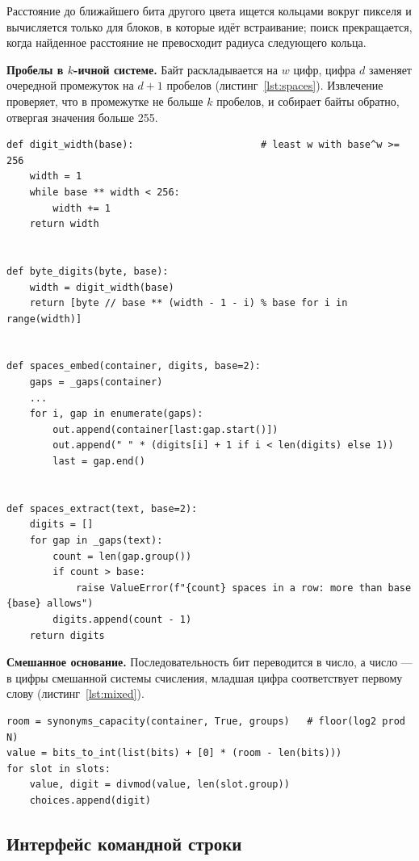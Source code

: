 \documentclass[14pt,a4paper]{extarticle}
\begin{document}
Расстояние до ближайшего бита другого цвета ищется кольцами вокруг пикселя и
вычисляется только для блоков, в которые идёт встраивание; поиск прекращается, когда
найденное расстояние не превосходит радиуса следующего кольца.

\textbf{Пробелы в $k$-ичной системе.} Байт раскладывается на $w$ цифр, цифра $d$
заменяет очередной промежуток на $d + 1$ пробелов (листинг~\ref{lst:spaces}).
Извлечение проверяет, что в промежутке не больше $k$ пробелов, и собирает байты
обратно, отвергая значения больше 255.

\begin{lstlisting}[style=python, caption={Пробелы в $k$-ичной системе}, label={lst:spaces}]
def digit_width(base):                      # least w with base^w >= 256
    width = 1
    while base ** width < 256:
        width += 1
    return width


def byte_digits(byte, base):
    width = digit_width(base)
    return [byte // base ** (width - 1 - i) % base for i in range(width)]


def spaces_embed(container, digits, base=2):
    gaps = _gaps(container)
    ...
    for i, gap in enumerate(gaps):
        out.append(container[last:gap.start()])
        out.append(" " * (digits[i] + 1 if i < len(digits) else 1))
        last = gap.end()


def spaces_extract(text, base=2):
    digits = []
    for gap in _gaps(text):
        count = len(gap.group())
        if count > base:
            raise ValueError(f"{count} spaces in a row: more than base {base} allows")
        digits.append(count - 1)
    return digits
\end{lstlisting}

\textbf{Смешанное основание.} Последовательность бит переводится в число, а число ---
в цифры смешанной системы счисления, младшая цифра соответствует первому слову
(листинг~\ref{lst:mixed}).

\begin{lstlisting}[style=python, caption={Синонимы со смешанным основанием}, label={lst:mixed}]
room = synonyms_capacity(container, True, groups)   # floor(log2 prod N)
value = bits_to_int(list(bits) + [0] * (room - len(bits)))
for slot in slots:
    value, digit = divmod(value, len(slot.group))
    choices.append(digit)
\end{lstlisting}

\subsection{Интерфейс командной строки}
\end{document}
